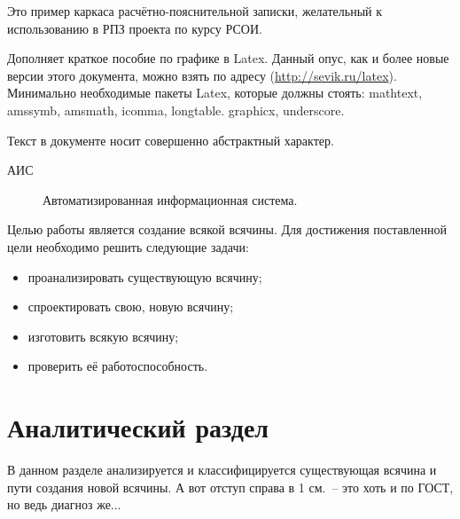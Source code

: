 \documentclass[utf8]{G7-32} %
\begin{document}

\frontmatter %

\Referat
Это пример каркаса расчётно-пояснительной записки, желательный к использованию в РПЗ проекта по курсу РСОИ.

Дополняет краткое пособие по графике в Latex.  Данный опус, как и более новые версии этого документа, можно взять по адресу (\url{http://sevik.ru/latex}). Минимально необходимые пакеты Latex, которые должны стоять: mathtext, amssymb, amsmath, icomma, longtable. graphicx, underscore.

Текст в документе носит совершенно абстрактный характер.

\tableofcontents


\Abbreviations %
\begin{description}
\item[АИС] Автоматизированная информационная система.
\end{description}

\Introduction

Целью работы является создание всякой всячины. Для достижения поставленной цели необходимо решить следующие задачи:
%
\begin{itemize}
\item проанализировать существующую всячину;
\item спроектировать свою, новую всячину;
\item изготовить всякую всячину;
\item проверить её работоспособность.
\end{itemize}

\mainmatter %

\chapter{Аналитический раздел}
%
%
В данном разделе анализируется и классифицируется существующая всячина и пути создания новой всячины. А вот отступ справа в 1 см.~-- это хоть и по ГОСТ, но ведь диагноз же...
%
\end{document}
